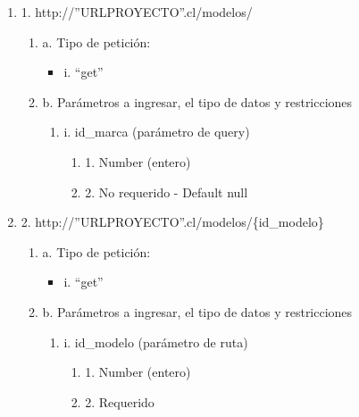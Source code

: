 \begin{enumerate}
    \item 1. http://”URLPROYECTO”.cl/modelos/
    \begin{enumerate}
        \item a. Tipo de petición:
            \begin{itemize}
               \item i. “get”
            \end{itemize}
        \item b. Parámetros a ingresar, el tipo de datos y restricciones
            \begin{enumerate}
                \item i. id\_marca (parámetro de query)
                    \begin{enumerate}
                        \item 1. Number (entero)
                        \item 2. No requerido - Default null
                    \end{enumerate}
            \end{enumerate}
    \end{enumerate}

    \item 2. http://”URLPROYECTO”.cl/modelos/\{id\_modelo\}
    \begin{enumerate}
        \item a. Tipo de petición:
            \begin{itemize}
               \item i. “get”
            \end{itemize}
        \item b. Parámetros a ingresar, el tipo de datos y restricciones
            \begin{enumerate}
                \item i. id\_modelo (parámetro de ruta)
                    \begin{enumerate}
                        \item 1. Number (entero)
                        \item 2. Requerido
                    \end{enumerate}
            \end{enumerate}
    \end{enumerate}


\end{enumerate}
